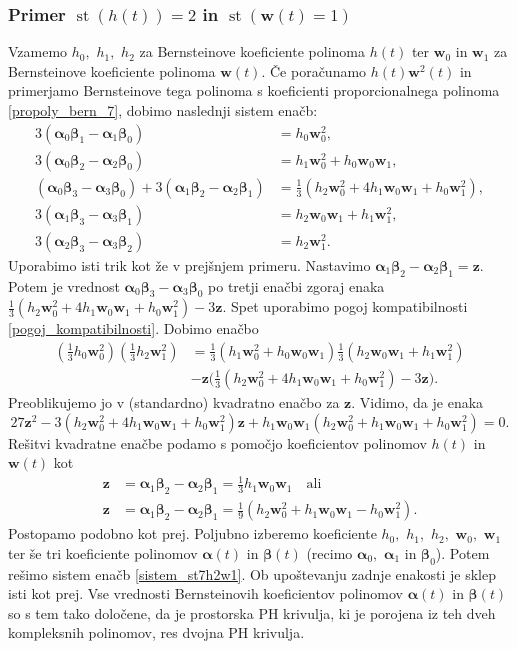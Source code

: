 \documentclass[12pt,a4paper,twoside]{article}
\theoremstyle{definition} %
\theoremstyle{plain} %
\numberwithin{equation}{section}  %
\newcommand{\wV}{\mathbf{w}}
\newcommand{\zV}{\mathbf{z}}
\newcommand{\balpha}{\boldsymbol \alpha}
\newcommand{\bbeta}{\boldsymbol \beta}
\DeclareMathOperator{\st}{st}
\begin{document}
\subsubsection{Primer \texorpdfstring{$\st(h(t))=2$}{st(h(t))=2} in \texorpdfstring{$\st(\wV(t)=1)$}{st(w(t))=1}}

Vzamemo $h_0,$ $h_1,$ $h_2$ za Bernsteinove koeficiente polinoma $h(t)$ ter $\wV_0$ in $\wV_1$ za Bernsteinove koeficiente polinoma $\wV(t).$ Če poračunamo $h(t)\wV^2(t)$ in primerjamo Bernsteinove tega polinoma s koeficienti proporcionalnega polinoma \eqref{propoly_bern_7}, dobimo naslednji sistem enačb:
\begin{align}
	3(\balpha_0\bbeta_1-\balpha_1\bbeta_0)&=h_0\wV_0^2,\nonumber\\
	3(\balpha_0\bbeta_2-\balpha_2\bbeta_0)&=h_1\wV_0^2+h_0\wV_0\wV_1,\nonumber\\
	(\balpha_0\bbeta_3-\balpha_3\bbeta_0)+3(\balpha_1\bbeta_2-\balpha_2\bbeta_1)&=\frac{1}{3}(h_2\wV_0^2+4h_1\wV_0\wV_1+h_0\wV_1^2),\nonumber\\
	3(\balpha_1\bbeta_3-\balpha_3\bbeta_1)&=h_2\wV_0\wV_1+h_1\wV_1^2,\nonumber\\
	3(\balpha_2\bbeta_3-\balpha_3\bbeta_2)&=h_2\wV_1^2.\label{sistem_st7h2w1}
\end{align}
Uporabimo isti trik kot že v prejšnjem primeru. Nastavimo $\balpha_1\bbeta_2-\balpha_2\bbeta_1=\zV.$ Potem je vrednost $\balpha_0\bbeta_3-\balpha_3\bbeta_0$ po tretji enačbi zgoraj enaka $\frac{1}{3}(h_2\wV_0^2+4h_1\wV_0\wV_1+h_0\wV_1^2)-3\zV.$ Spet uporabimo pogoj kompatibilnosti \eqref{pogoj_kompatibilnosti}. Dobimo enačbo
\begin{align*}
	\left(\frac{1}{3}h_0\wV_0^2\right)\left(\frac{1}{3}h_2\wV_1^2\right)&=\frac{1}{3}(h_1\wV_0^2+h_0\wV_0\wV_1)\frac{1}{3}(h_2\wV_0\wV_1+h_1\wV_1^2)\nonumber\\
	&-\zV\Big(\frac{1}{3}(h_2\wV_0^2+4h_1\wV_0\wV_1+h_0\wV_1^2)-3\zV\Big).
\end{align*}
Preoblikujemo jo v (standardno) kvadratno enačbo za $\zV.$ Vidimo, da je enaka
\begin{equation*}
	27\zV^2-3(h_2\wV_0^2+4h_1\wV_0\wV_1+h_0\wV_1^2)\zV+h_1\wV_0\wV_1(h_2\wV_0^2+h_1\wV_0\wV_1+h_0\wV_1^2)=0.
\end{equation*}
Rešitvi kvadratne enačbe podamo s pomočjo koeficientov polinomov $h(t)$ in $\wV(t)$ kot
\begin{align}
	\zV&=\balpha_1\bbeta_2-\balpha_2\bbeta_1=\frac{1}{3}h_1\wV_0\wV_1\quad\text{ali}\nonumber\\
	\zV&=\balpha_1\bbeta_2-\balpha_2\bbeta_1=\frac{1}{9}(h_2\wV_0^2+h_1\wV_0\wV_1-h_0\wV_1^2).\label{st7h2w1}
\end{align}
Postopamo podobno kot prej. Poljubno izberemo koeficiente $h_0,$ $h_1,$ $h_2,$ $\wV_0,$ $\wV_1$ ter še tri koeficiente polinomov $\balpha(t)$ in $\bbeta(t)$ (recimo $\balpha_0,$ $\balpha_1$ in $\bbeta_0$). Potem rešimo sistem enačb \eqref{sistem_st7h2w1}. Ob upoštevanju zadnje enakosti je sklep isti kot prej. Vse vrednosti Bernsteinovih koeficientov polinomov $\balpha(t)$ in $\bbeta(t)$ so s tem tako določene, da je prostorska PH krivulja, ki je porojena iz teh dveh kompleksnih polinomov, res dvojna PH krivulja.
\end{document}
